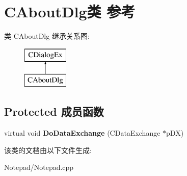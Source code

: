 \hypertarget{class_c_about_dlg}{}\section{C\+About\+Dlg类 参考}
\label{class_c_about_dlg}
类 C\+About\+Dlg 继承关系图\+:\begin{figure}[H]
\begin{center}
\leavevmode
\includegraphics[height=2.000000cm]{class_c_about_dlg}
\end{center}
\end{figure}
\subsection*{Protected 成员函数}
\begin{DoxyCompactItemize}
\item 
\mbox{\label{class_c_about_dlg_ab83db7484fec957282d7d5a21aed4df4}} 
virtual void {\bfseries Do\+Data\+Exchange} (C\+Data\+Exchange $\ast$p\+DX)
\end{DoxyCompactItemize}


该类的文档由以下文件生成\+:\begin{DoxyCompactItemize}
\item 
Notepad/Notepad.\+cpp\end{DoxyCompactItemize}

